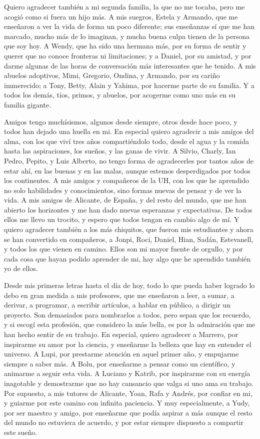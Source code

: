 Quiero agradecer también a mi segunda familia, la que no me tocaba, pero me acogió como si fuera un hijo más.
A mis suegros, Estela y Armando, que me enseñaron a ver la vida de forma un poco diferente; sus enseñanzas sí que me han marcado, mucho más de lo imaginan, y mucha buena culpa tienen de la persona que soy hoy.
A Wendy, que ha sido una hermana más, por su forma de sentir y querer que no conoce fronteras ni limitaciones; y a Daniel, por su amistad, y por darme algunas de las horas de conversación más interesantes que he tenido.
A mis abuelos adoptivos, Mimi, Gregorio, Ondina, y Armando, por su cariño immerecido; a Tony, Betty, Alain y Yahima, por hacerme parte de su familia.
Y a todos los demás, tíos, primos, y abuelos, por acogerme como uno más en su familia gigante.

Amigos tengo muchísismos, algunos desde siempre, otros desde hace poco, y todos han dejado una huella en mi.
En especial quiero agradecir a mis amigos del alma, con los que viví tres años compartiéndolo todo, desde el agua y la comida hasta las aspiraciones, los sueños, y las ganas de vivir.
A Silvio, Charly, Ian Pedro, Pepito, y Luis Alberto, no tengo forma de agradecerles por tantos años de estar ahí, en las buenas y en las malas, aunque estemos desperdigados por todos los continentes.
A mis amigos y compañeros de la UH, con los que he aprendido no solo habilidades y conocimientos, sino formas nuevas de pensar y de ver la vida.
A mis amigos de Alicante, de España, y del resto del mundo, que me han abierto los horizontes y me han dado nuevas esperanzas y expectativas.
De todos ellos me llevo un trocito, y espero que todos tengan en cambio algo de mí.
Y quiero agradecer también a los más chiquitos, que fueron mis estudiantes y ahora se han convertido en compañeros, a Jonpi, Roci, Daniel, Hian, Sadán, Estevanell, y todos los que vienen en camino.
Ellos son mi mayor fuente de orgullo, y por cada cosa que hayan podido aprender de mi, hay algo que he aprendido también yo de ellos.

Desde mis primeras letras hasta el día de hoy, todo lo que pueda haber logrado lo debo en gran medida a mis profesores, que me enseñaron a leer, a sumar, a derivar, a programar, a escribir artículos, a hablar en público, a dirigir un proyecto.
Son demasiados para nombrarlos a todos, pero sepan que los recuerdo, y si escogí esta profesión, que considero la más bella, es por la admiración que me han hecho sentir de su trabajo.
En especial, quiero agradecer a Marrero, por inspirarme su amor por la ciencia, y enseñarme la belleza que hay en entender el universo.
A Lupi, por prestarme atención en aquel primer año, y empujarme siempre a saber más.
A Bolu, por enseñarme a pensar como un científico, y animarme a seguir esta vida.
A Luciano y Katrib, por inspirarme con su energía inagotable y demostrarme que no hay cansancio que valga si uno ama su trabajo.
Por supuesto, a mis tutores de Alicante, Yoan, Rafa y Andrés, por confiar en mi, y guiarme por este camino con infinita paciencia.
Y muy especialmente, a Yudy, por ser maestro y amigo, por enseñarme que podía aspirar a más aunque el resto del mundo no estuviera de acuerdo, y por estar siempre dispuesto a compartir este sueño.

